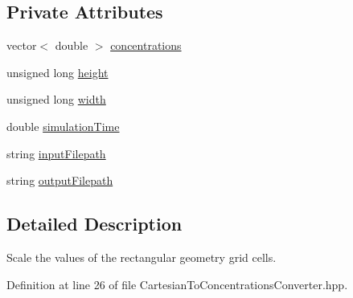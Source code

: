 \subsection*{Private Attributes}
\begin{DoxyCompactItemize}
\item 
vector$<$ double $>$ \hyperlink{classmultiscale_1_1video_1_1CartesianToConcentrationsConverter_a335f54163cbabeaa80c1da811b9f9c0c}{concentrations}
\item 
unsigned long \hyperlink{classmultiscale_1_1video_1_1CartesianToConcentrationsConverter_a94e58072f2e143bd6476133370ffb37f}{height}
\item 
unsigned long \hyperlink{classmultiscale_1_1video_1_1CartesianToConcentrationsConverter_ae6fba5af405d884c7b70ed206a6d5cb1}{width}
\item 
double \hyperlink{classmultiscale_1_1video_1_1CartesianToConcentrationsConverter_a6e66af60b82513b3186fdb32cad44597}{simulation\-Time}
\item 
string \hyperlink{classmultiscale_1_1video_1_1CartesianToConcentrationsConverter_affebbc7e1c67692bd529f19fc0451e58}{input\-Filepath}
\item 
string \hyperlink{classmultiscale_1_1video_1_1CartesianToConcentrationsConverter_a9215448e33876a581b206a89b6651fd0}{output\-Filepath}
\end{DoxyCompactItemize}


\subsection{Detailed Description}
Scale the values of the rectangular geometry grid cells. 

Definition at line 26 of file Cartesian\-To\-Concentrations\-Converter.\-hpp.



